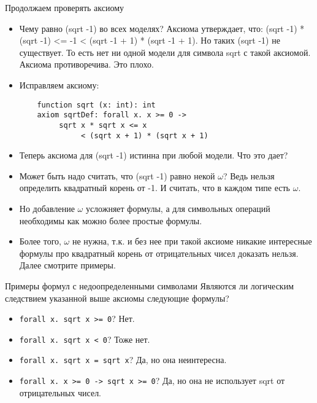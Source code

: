 \documentclass[hyperref={unicode=true}]{beamer}
\begin{document}
    \begin{frame}[fragile]{Продолжаем проверять аксиому}
    \begin{itemize}
    \item
    Чему равно (sqrt -1) во всех моделях? Аксиома утверждает, что:
    (sqrt -1) * (sqrt -1) <= -1 < (sqrt -1 + 1) * (sqrt -1 + 1).
    Но таких (sqrt -1) не существует. То есть нет ни одной модели
    для символа sqrt с такой аксиомой. Аксиома противоречива. Это плохо.
    \item
    Исправляем аксиому:
    \begin{lstlisting}
    function sqrt (x: int): int
    axiom sqrtDef: forall x. x >= 0 ->
         sqrt x * sqrt x <= x
              < (sqrt x + 1) * (sqrt x + 1)
    \end{lstlisting}
    \end{itemize}
    \end{frame}

    \begin{frame}
    \begin{itemize}
    \item
    Теперь аксиома для (sqrt -1) истинна при любой модели. Что это дает?
    \item
    Может быть надо считать, что (sqrt -1) равно некой $\omega$? Ведь
    нельзя определить квадратный корень от -1. И считать, что в каждом
    типе есть $\omega$.
    \item
    Но добавление $\omega$ усложняет формулы, а для символьных операций
    необходимы как можно более простые формулы.
    \item
    Более того, $\omega$ не нужна, т.к. и без нее при такой аксиоме
    никакие интересные формулы про
    квадратный корень от отрицательных чисел доказать нельзя.
    Далее смотрите примеры.
    \end{itemize}
    \end{frame}

    \begin{frame}{Примеры формул с недоопределенными символами}
    Являются ли логическим следствием указанной выше аксиомы
    следующие формулы?
    \begin{itemize}
    \item
    \texttt{forall x. sqrt x >= 0}?
    Нет.
    \item
    \texttt{forall x. sqrt x < 0}?
    Тоже нет.
    \item
    \texttt{forall x. sqrt x = sqrt x}?
    Да, но она неинтересна.
    \item
    \texttt{forall x. x >= 0 -> sqrt x >= 0}?
    Да, но она не использует sqrt от отрицательных чисел.
    \end{itemize}
    \end{frame}
\end{document}
